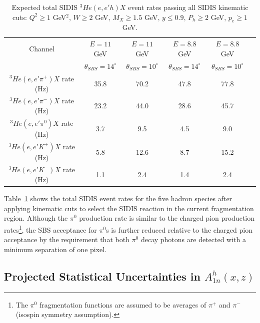 \begin{table}[h]
  \caption{\label{RateTable} Expected total SIDIS $^3He(e,e'h)X$ event rates passing all SIDIS kinematic cuts: $Q^2 \ge 1$ GeV$^2$, $W \ge 2$ GeV, $M_X \ge 1.5$ GeV, $y \le 0.9$, $P_h \ge 2$ GeV, $p_e \ge 1$ GeV.}
  \begin{center}
    \begin{tabular}{cccccc}
      \hline \hline
      Channel & $E = 11$ GeV & $E = 11$ GeV & $E = 8.8$ GeV & $E=8.8$ GeV \\ 
      & $\theta_{SBS} = 14^\circ$ & $\theta_{SBS}=10^\circ$ & $\theta_{SBS} = 14^\circ$ & $\theta_{SBS} = 10^\circ$ \\ \hline 
      $^3He(e,e'\pi^+)X$ rate (Hz) & 35.8 & 70.2 & 47.8 & 77.8 \\ 
      $^3He(e,e'\pi^-)X$ rate (Hz) & 23.2 & 44.0 & 28.6 & 45.7 \\
      $^3He(e,e'\pi^0)X$ rate (Hz) & 3.7 & 9.5 & 4.5 & 9.0 \\
      $^3He(e,e'K^+)X$ rate (Hz) & 5.8 & 12.6 & 8.7 & 15.2 \\
      $^3He(e,e'K^-)X$ rate (Hz) & 1.1 & 2.4 & 1.4 & 2.4 \\ \hline \hline 
    \end{tabular}
  \end{center}
\end{table}
Table~\ref{RateTable} shows the total SIDIS event rates for the five hadron species after applying kinematic cuts to select the SIDIS reaction in the current fragmentation region. Although the $\pi^0$ production rate is similar to the charged pion production rates\footnote{The $\pi^0$ fragmentation functions are assumed to be averages of $\pi^+$ and $\pi^-$ (isospin symmetry assumption).}, the SBS acceptance for $\pi^0$s is further reduced relative to the charged pion acceptance by the requirement that both $\pi^0$ decay photons are detected with a minimum separation of one pixel.
\subsection{Projected Statistical Uncertainties in $A_{1n}^h(x,z)$}

